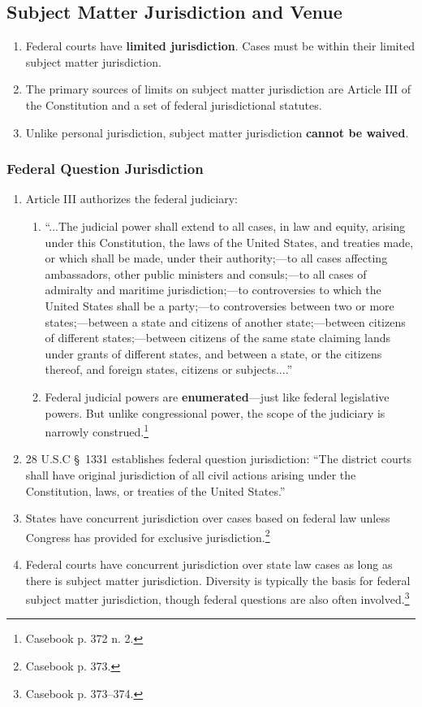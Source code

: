 \subsection{Subject Matter Jurisdiction and Venue}

\begin{enumerate}
    \item Federal courts have \textbf{limited jurisdiction}. Cases must be within their limited subject matter jurisdiction.
    \item The primary sources of limits on subject matter jurisdiction are Article III of the Constitution and a set of federal jurisdictional statutes.
    \item Unlike personal jurisdiction, subject matter jurisdiction \textbf{cannot be waived}.
\end{enumerate}

\subsubsection{Federal Question Jurisdiction}

\begin{enumerate}
    \item Article III authorizes the federal judiciary:
    \begin{enumerate}
        \item ``...The judicial power shall extend to all cases, in law and equity, arising under this Constitution, the laws of the United States, and treaties made, or which shall be made, under their authority;---to all cases affecting ambassadors, other public ministers and consuls;---to all cases of admiralty and maritime jurisdiction;---to controversies to which the United States shall be a party;---to controversies between two or more states;---between a state and citizens of another state;---between citizens of different states;---between citizens of the same state claiming lands under grants of different states, and between a state, or the citizens thereof, and foreign states, citizens or subjects....''
        \item Federal judicial powers are \textbf{enumerated}---just like federal legislative powers. But unlike congressional power, the scope of the judiciary is narrowly construed.\footnote{Casebook p. 372 n. 2.}
    \end{enumerate}
    \item 28 U.S.C \S\ 1331 establishes federal question jurisdiction: ``The district courts shall have original jurisdiction of all civil actions arising under the Constitution, laws, or treaties of the United States.''
    \item States have concurrent jurisdiction over cases based on federal law unless Congress has provided for exclusive jurisdiction.\footnote{Casebook p. 373.}
    \item Federal courts have concurrent jurisdiction over state law cases as long as there is subject matter jurisdiction. Diversity is typically the basis for federal subject matter jurisdiction, though federal questions are also often involved.\footnote{Casebook p. 373--374.}
\end{enumerate}

